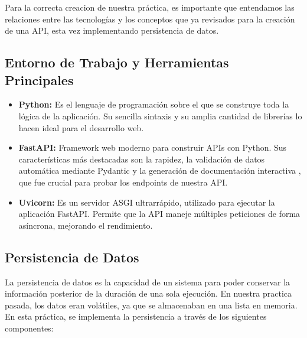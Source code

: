 \documentclass[12pt]{article}
\begin{document}
Para la correcta creacion de nuestra práctica, es importante que entendamos las relaciones entre las tecnologías y los conceptos que ya revisados para la creación de una API, esta vez implementando persistencia de datos.


\subsection*{Entorno de Trabajo y Herramientas Principales}
\begin{itemize}
    \item \textbf{Python:} Es el lenguaje de programación sobre el que se construye toda la lógica de la aplicación. Su sencilla sintaxis y su amplia cantidad de librerías lo hacen ideal para el desarrollo web.\cite{ref2}
    \item \textbf{FastAPI:} Framework web moderno para construir APIs con Python. Sus características más destacadas son la rapidez, la validación de datos automática mediante Pydantic y la generación de documentación interactiva , que fue crucial para probar los endpoints de nuestra API.
    \item \textbf{Uvicorn:} Es un servidor ASGI ultrarrápido, utilizado para ejecutar la aplicación FastAPI. Permite que la API maneje múltiples peticiones de forma asíncrona, mejorando el rendimiento.\cite{ref3}
\end{itemize}

\subsection*{Persistencia de Datos}
La persistencia de datos es la capacidad de un sistema para poder conservar la información posterior de la duración de una sola ejecución. En nuestra practica pasada, los datos eran volátiles, ya que se almacenaban en una lista en memoria. En esta práctica, se implementa la persistencia a través de los siguientes componentes:
\end{document}
